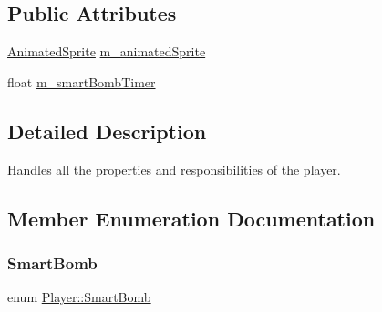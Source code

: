 \subsection*{Public Attributes}
\begin{DoxyCompactItemize}
\item 
\hyperlink{class_animated_sprite}{Animated\+Sprite} \hyperlink{class_player_a6d6dfb4b46e5aa9eac78fd8cced73825}{m\+\_\+animated\+Sprite}
\item 
float \hyperlink{class_player_adb6552419db92fdbc9aeda36e807c6ec}{m\+\_\+smart\+Bomb\+Timer}
\end{DoxyCompactItemize}


\subsection{Detailed Description}
Handles all the properties and responsibilities of the player. 



\subsection{Member Enumeration Documentation}
\mbox{\label{class_player_afd539a18e0e4c3bbf07c820914c0511e}} 
\subsubsection{\texorpdfstring{Smart\+Bomb}{SmartBomb}}
{\footnotesize\ttfamily enum \hyperlink{class_player_afd539a18e0e4c3bbf07c820914c0511e}{Player\+::\+Smart\+Bomb}}

